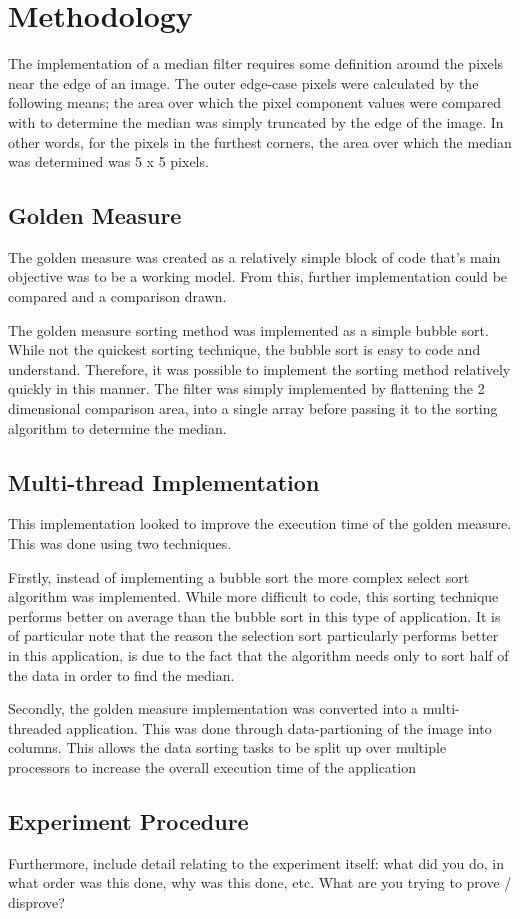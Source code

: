 \section{Methodology}
The implementation of a median filter requires some definition around the pixels near the edge of an image. The outer edge-case pixels were calculated by the following means; the area over which the pixel component values were compared with to determine the median was simply truncated by the edge of the image. In other words, for the pixels in the furthest corners, the area over which the median was determined was 5 x 5 pixels.

\subsection{Golden Measure}
The golden measure was created as a relatively simple block of code that's main objective was to be a working model. From this, further implementation could be compared and a comparison drawn.

The golden measure sorting method was implemented as a simple bubble sort. While not the quickest sorting technique, the bubble sort is easy to code and understand. Therefore, it was possible to implement the sorting method relatively quickly in this manner. The filter was simply implemented by flattening the 2 dimensional comparison area, into a single array before passing it to the sorting algorithm to determine the median.

\subsection{Multi-thread Implementation}
This implementation looked to improve the execution time of the golden measure. This was done using two techniques. 

Firstly, instead of implementing a bubble sort the more complex select sort algorithm was implemented. While more difficult to code, this sorting technique performs better on average than the bubble sort in this type of application. It is of particular note that the reason the selection sort particularly performs better in this application, is due to the fact that the algorithm needs only to sort half of the data in order to find the median.

Secondly, the golden measure implementation was converted into a multi-threaded application. This was done through data-partioning of the image into columns. This allows the data sorting tasks to be split up over multiple processors to increase the overall execution time of the application
  
\subsection{Experiment Procedure}
Furthermore, include detail relating to the experiment itself: what did you do, in what order was this done, why was this done, etc.  What are you trying to prove / disprove?